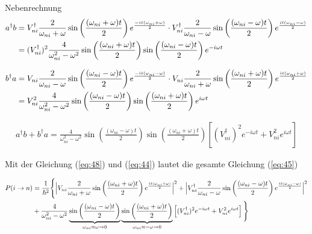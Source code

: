Nebenrechnung
\begin{align}
  \label{eq:46}
  a^\dagger b &= V_{ni}^\dagger \frac{2}{\omega_{ni}+\omega}\sin\left(\frac{(\omega_{ni}+\omega) t}{2}\right)e^{\frac{-it(\omega_{ni}+\omega)}{2}}\cdot  V^\dagger_{ni} \frac{2}{\omega_{ni}-\omega}\sin\left(\frac{(\omega_{ni}-\omega) t}{2}\right)e^{\frac{it(\omega_{ni}-\omega)}{2} } \notag\\
&=(V_{ni}^\dagger)^2 \frac{4}{\omega_{ni}^2 -\omega^2}\sin\left(\frac{(\omega_{ni}+\omega) t}{2}\right)\sin\left(\frac{(\omega_{ni}-\omega) t}{2}\right)e^{-i\omega t}
\end{align}

\begin{align}
  \label{eq:47}
    b^\dagger a &= V_{ni}\frac{2}{\omega_{ni}-\omega}\sin\left(\frac{(\omega_{ni}-\omega) t}{2}\right)e^{\frac{-it(\omega_{ni}-\omega)}{2}}\cdot  V_{ni} \frac{2}{\omega_{ni}+\omega}\sin\left(\frac{(\omega_{ni}+\omega) t}{2}\right)e^{\frac{it(\omega_{ni}+\omega)}{2} } \notag\\
&=V_{ni}^2 \frac{4}{\omega_{ni}^2 -\omega^2}\sin\left(\frac{(\omega_{ni}-\omega) t}{2}\right)\sin\left(\frac{(\omega_{ni}+\omega) t}{2}\right)e^{i\omega t}
\end{align}

\begin{align}
  \label{eq:48}
  a^\dagger b + b^\dagger a = \frac{4}{\omega_{ni}^2 -\omega^2}\sin\left(\frac{(\omega_{ni}-\omega) t}{2}\right)\sin\left(\frac{(\omega_{ni}+\omega) t}{2}\right)\left[(V_{ni}^\dagger)^2e^{-i\omega t} +   V_{ni}^2 e^{i\omega t}  \right]
\end{align}



Mit der Gleichung (\ref{eq:48}) und (\ref{eq:44}) lautet die gesamte Gleichung (\ref{eq:45})


\begin{align}
  \label{eq:49}
   P(i\rightarrow n) &= \frac{1}{\hbar^2}\Bigg\{  \Big|V_{ni} \frac{2}{\omega_{ni}+\omega}\sin\left(\frac{(\omega_{ni}+\omega) t}{2}\right)e^{\frac{it(\omega_{ni}+\omega)}{2}}\Big|^2 +  \Big|V^\dagger_{ni} \frac{2}{\omega_{ni}-\omega}\sin\left(\frac{(\omega_{ni}-\omega) t}{2}\right)e^{\frac{it(\omega_{ni}-\omega)}{2} }\Big|^2 \notag \\
 & + \frac{4}{\omega_{ni}^2 -\omega^2} \underbr{\sin\left(\frac{(\omega_{ni}-\omega) t}{2}\right)}_{\omega_{ni}\approx \omega \to 0}  \underbr{\sin\left(\frac{(\omega_{ni}+\omega) t}{2}\right)}_{\omega_{ni}\approx -\omega \to 0} \left[(V_{ni}^\dagger)^2e^{-i\omega t} +   V_{ni}^2 e^{i\omega t}  \right]  \Bigg\}
\end{align}

